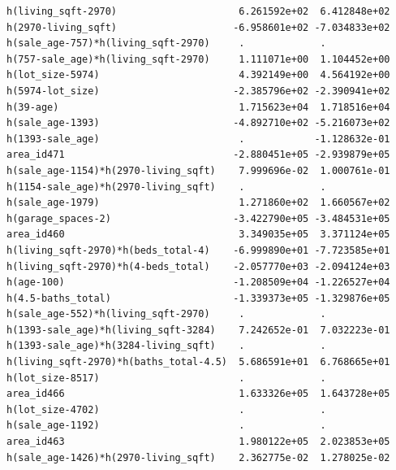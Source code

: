 \documentclass[
]{article}
\begin{document}
\begin{verbatim}
h(living_sqft-2970)                     6.261592e+02  6.412848e+02
h(2970-living_sqft)                    -6.958601e+02 -7.034833e+02
h(sale_age-757)*h(living_sqft-2970)     .             .           
h(757-sale_age)*h(living_sqft-2970)     1.111071e+00  1.104452e+00
h(lot_size-5974)                        4.392149e+00  4.564192e+00
h(5974-lot_size)                       -2.385796e+02 -2.390941e+02
h(39-age)                               1.715623e+04  1.718516e+04
h(sale_age-1393)                       -4.892710e+02 -5.216073e+02
h(1393-sale_age)                        .            -1.128632e-01
area_id471                             -2.880451e+05 -2.939879e+05
h(sale_age-1154)*h(2970-living_sqft)    7.999696e-02  1.000761e-01
h(1154-sale_age)*h(2970-living_sqft)    .             .           
h(sale_age-1979)                        1.271860e+02  1.660567e+02
h(garage_spaces-2)                     -3.422790e+05 -3.484531e+05
area_id460                              3.349035e+05  3.371124e+05
h(living_sqft-2970)*h(beds_total-4)    -6.999890e+01 -7.723585e+01
h(living_sqft-2970)*h(4-beds_total)    -2.057770e+03 -2.094124e+03
h(age-100)                             -1.208509e+04 -1.226527e+04
h(4.5-baths_total)                     -1.339373e+05 -1.329876e+05
h(sale_age-552)*h(living_sqft-2970)     .             .           
h(1393-sale_age)*h(living_sqft-3284)    7.242652e-01  7.032223e-01
h(1393-sale_age)*h(3284-living_sqft)    .             .           
h(living_sqft-2970)*h(baths_total-4.5)  5.686591e+01  6.768665e+01
h(lot_size-8517)                        .             .           
area_id466                              1.633326e+05  1.643728e+05
h(lot_size-4702)                        .             .           
h(sale_age-1192)                        .             .           
area_id463                              1.980122e+05  2.023853e+05
h(sale_age-1426)*h(2970-living_sqft)    2.362775e-02  1.278025e-02
                                                                  

\end{verbatim}
\end{document}
